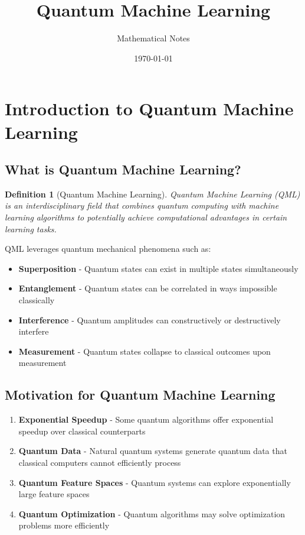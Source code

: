 \documentclass[11pt]{article}
\title{Quantum Machine Learning}
\author{Mathematical Notes}
\date{\today}
\newtheorem{definition}{Definition}[section]
\begin{document}
\maketitle
\tableofcontents
\newpage

\section{Introduction to Quantum Machine Learning}

\subsection{What is Quantum Machine Learning?}

\begin{definition}[Quantum Machine Learning]
Quantum Machine Learning (QML) is an interdisciplinary field that combines quantum computing with machine learning algorithms to potentially achieve computational advantages in certain learning tasks.
\end{definition}

QML leverages quantum mechanical phenomena such as:
\begin{itemize}
    \item \textbf{Superposition} - Quantum states can exist in multiple states simultaneously
    \item \textbf{Entanglement} - Quantum states can be correlated in ways impossible classically
    \item \textbf{Interference} - Quantum amplitudes can constructively or destructively interfere
    \item \textbf{Measurement} - Quantum states collapse to classical outcomes upon measurement
\end{itemize}

\subsection{Motivation for Quantum Machine Learning}

\begin{enumerate}
    \item \textbf{Exponential Speedup} - Some quantum algorithms offer exponential speedup over classical counterparts
    \item \textbf{Quantum Data} - Natural quantum systems generate quantum data that classical computers cannot efficiently process
    \item \textbf{Quantum Feature Spaces} - Quantum systems can explore exponentially large feature spaces
    \item \textbf{Quantum Optimization} - Quantum algorithms may solve optimization problems more efficiently
\end{enumerate}
\end{document}
